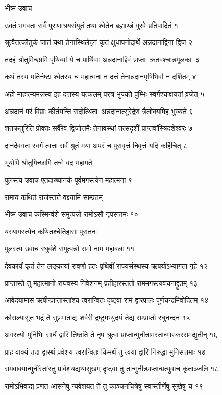 

भीष्म उवाच

उक्तं भगवता सर्वं पुराणाश्रयसंयुतं
तथा श्वेतेन ब्रह्माण्डं गुरवे प्रतिपादितं १

श्रुत्वैतत्कौतुकं जातं यथा तेनास्थिलेहनं
कृतं क्षुधापनोदार्थे अन्नदानाद्विना द्विज २

तदहं श्रोतुमिच्छामि पृथिव्यां ये च पार्थिवाः
अन्नदानाद्दिवं प्राप्ताः क्रतवश्चान्नमूलकाः ३

कथं तस्य मतिर्नष्टा श्वेतस्य च महात्मनः
न दत्तं तेनान्नदानमृषिभिर्वा न दर्शितम् ४

अहो माहात्म्यमन्नस्य इह दत्तस्य यत्फलम्
परत्र भुज्यते पुम्भिः स्वर्गश्चाक्षयतां व्रजेत् ५

अन्नदानं परं विप्राः कीर्तयन्ति सदोत्थिताः
अन्नदानात्सुरेद्रेण त्रैलोक्यमिह भुज्यते ६

शतक्रतुरिति प्रोक्तः सर्वैरेव द्विजोत्तमैः
तेनावस्थां तत्सदृशीं प्राप्तवांस्त्रिदशेश्वरः ७

दानदेवगतः स्वर्गं त्वत्तः सर्वं श्रुतं मया
अपरं च पुरावृत्तं निवृत्तं यदि कर्हिचित् ८

भूयोपि श्रोतुमिच्छामि तन्मे वद महामते

पुलस्त्य उवाच
एतदाख्यानकं पूर्वमगस्त्येन महात्मना ९

रामाय कथितं राजंस्तत्ते वक्ष्यामि साम्प्रतम्

भीष्म उवाच
कस्मिन्वंशे समुत्पन्नो रामोऽसौ नृपसत्तमः १०

यस्यागस्त्येन कथितश्चेतिहासः पुरातनः

पुलस्त्य उवाच
रघुवंशे समुत्पन्नो रामो नाम महाबलः ११

देवकार्यं कृतं तेन लङ्कायां रावणो हतः
पृथिवीं राज्यसंस्थस्य ऋषयोऽभ्यागता गृहे १२

प्राप्तास्ते तु महात्मानो राघवस्य निवेशनम्
प्रतीहारस्ततो राममगस्त्यवचनाद्द्रुतम् १३

आवेदयामास ऋषीन्प्राप्तास्तांश्च त्वरान्वितः
दृष्ट्वा रामं द्वारपालः पूर्णचन्द्रमिवोदितम् १४

कौसल्यासुत भद्रं ते सुप्रभाताद्य शर्वरी
द्रष्टुमभ्युदयं तेद्य सम्प्राप्तो रघुनन्दन १५

अगस्त्यो मुनिभिः सार्धं द्वारि तिष्ठति ते नृप
श्रुत्वा प्राप्तान्मुनीन्रामस्तान्भास्करसमद्युतीन् १६

प्राह वाक्यं तदा द्वास्थं प्रवेशय त्वरान्वितः
किमर्थं तु त्वया द्वारि निरुद्धा मुनिसत्तमाः १७

रामवाक्यान्मुनींस्तांस्तु प्रावेशयद्यथासुखम्
दृष्ट्वा तु तान्मुनीन्न्प्राप्तान्प्रत्युवाच कृताञ्जलि १८

रामोऽभिवाद्य प्रणत आसनेषु न्यवेशयत्
ते तु काञ्चनचित्रेषु स्वास्तीर्णेषु सुखेषु च १९


